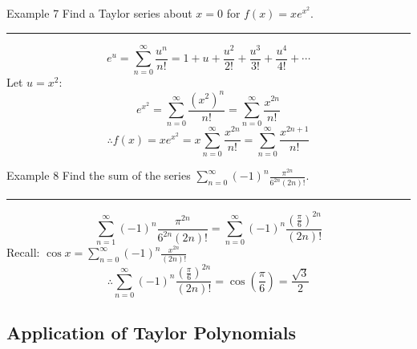 \documentclass[12pt,a4paper]{article}
\begin{document}
\begin{eg}{Example 7}
	Find a Taylor series about $x=0$ for $f(x)=xe^{x^2}$.\\
	\noindent\rule[0.25\baselineskip]{\textwidth}{1pt}
	$$e^u=\sum^\infty_{n=0}\frac{u^n}{n!}=1+u+\frac{u^2}{2!}+\frac{u^3}{3!}+\frac{u^4}{4!}+\cdots$$
	Let $u=x^2$:
	$$e^{x^2}=\sum^\infty_{n=0}\frac{(x^2)^n}{n!}=\sum^\infty_{n=0}\frac{x^{2n}}{n!}$$
	$$\therefore f(x)=xe^{x^2}=x\sum^\infty_{n=0}\frac{x^{2n}}{n!}=\sum^\infty_{n=0}\frac{x^{2n+1}}{n!}$$
\end{eg}
\begin{eg}{Example 8}
	Find the sum of the series $\displaystyle\sum^\infty_{n=0}(-1)^n\frac{\pi^{2n}}{6^{2n}(2n)!}$.\\
	\noindent\rule[0.25\baselineskip]{\textwidth}{1pt}
	$$\sum^\infty_{n=1}(-1)^n\frac{\pi^{2n}}{6^{2n}(2n)!}=\sum^\infty_{n=0}(-1)^n\frac{\left(\frac{\pi}{6}\right)^{2n}}{(2n)!}$$
	Recall: $\displaystyle\cos{x}=\sum^\infty_{n=0}(-1)^n\frac{x^{2n}}{(2n)!}$
	$$\therefore\sum^\infty_{n=0}(-1)^n\frac{\left(\frac{\pi}{6}\right)^{2n}}{(2n)!}=\cos{\left(\frac{\pi}{6}\right)}=\frac{\sqrt{3}}{2}$$
\end{eg}

\subsection{Application of Taylor Polynomials}
\end{document}
